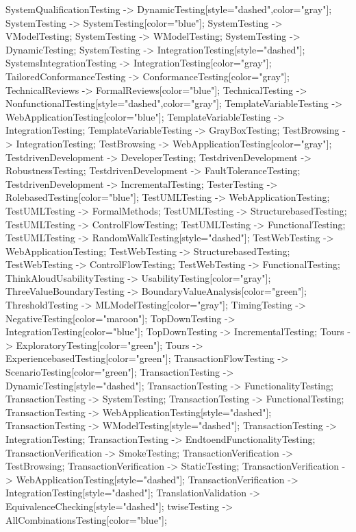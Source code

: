 \documentclass{article}
\begin{document}
{SystemQualificationTesting -> DynamicTesting[style="dashed",color="gray"];
SystemTesting -> SystemTesting[color="blue"];
SystemTesting -> VModelTesting;
SystemTesting -> WModelTesting;
SystemTesting -> DynamicTesting;
SystemTesting -> IntegrationTesting[style="dashed"];
SystemsIntegrationTesting -> IntegrationTesting[color="gray"];
TailoredConformanceTesting -> ConformanceTesting[color="gray"];
TechnicalReviews -> FormalReviews[color="blue"];
TechnicalTesting -> NonfunctionalTesting[style="dashed",color="gray"];
TemplateVariableTesting -> WebApplicationTesting[color="blue"];
TemplateVariableTesting -> IntegrationTesting;
TemplateVariableTesting -> GrayBoxTesting;
TestBrowsing -> IntegrationTesting;
TestBrowsing -> WebApplicationTesting[color="gray"];
TestdrivenDevelopment -> DeveloperTesting;
TestdrivenDevelopment -> RobustnessTesting;
TestdrivenDevelopment -> FaultToleranceTesting;
TestdrivenDevelopment -> IncrementalTesting;
TesterTesting -> RolebasedTesting[color="blue"];
TestUMLTesting -> WebApplicationTesting;
TestUMLTesting -> FormalMethods;
TestUMLTesting -> StructurebasedTesting;
TestUMLTesting -> ControlFlowTesting;
TestUMLTesting -> FunctionalTesting;
TestUMLTesting -> RandomWalkTesting[style="dashed"];
TestWebTesting -> WebApplicationTesting;
TestWebTesting -> StructurebasedTesting;
TestWebTesting -> ControlFlowTesting;
TestWebTesting -> FunctionalTesting;
ThinkAloudUsabilityTesting -> UsabilityTesting[color="gray"];
ThreeValueBoundaryTesting -> BoundaryValueAnalysis[color="green"];
ThresholdTesting -> MLModelTesting[color="gray"];
TimingTesting -> NegativeTesting[color="maroon"];
TopDownTesting -> IntegrationTesting[color="blue"];
TopDownTesting -> IncrementalTesting;
Tours -> ExploratoryTesting[color="green"];
Tours -> ExperiencebasedTesting[color="green"];
TransactionFlowTesting -> ScenarioTesting[color="green"];
TransactionTesting -> DynamicTesting[style="dashed"];
TransactionTesting -> FunctionalityTesting;
TransactionTesting -> SystemTesting;
TransactionTesting -> FunctionalTesting;
TransactionTesting -> WebApplicationTesting[style="dashed"];
TransactionTesting -> WModelTesting[style="dashed"];
TransactionTesting -> IntegrationTesting;
TransactionTesting -> EndtoendFunctionalityTesting;
TransactionVerification -> SmokeTesting;
TransactionVerification -> TestBrowsing;
TransactionVerification -> StaticTesting;
TransactionVerification -> WebApplicationTesting[style="dashed"];
TransactionVerification -> IntegrationTesting[style="dashed"];
TranslationValidation -> EquivalenceChecking[style="dashed"];
twiseTesting -> AllCombinationsTesting[color="blue"];
}
\end{document}

